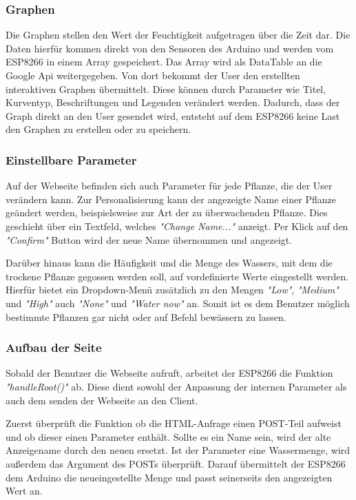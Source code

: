 \subsubsection{Graphen}
Die Graphen stellen den Wert der Feuchtigkeit aufgetragen über die Zeit dar. Die Daten
hierfür kommen direkt von den Sensoren des Arduino und werden vom ESP8266 in einem
Array gespeichert.
Das Array wird als DataTable an die Google Api weitergegeben. Von dort bekommt der User
den erstellten interaktiven Graphen übermittelt. Diese können durch Parameter wie Titel,
Kurventyp, Beschriftungen und Legenden verändert werden.
Dadurch, dass der Graph direkt an den User gesendet wird, entsteht auf dem ESP8266 keine
Last den Graphen zu erstellen oder zu speichern.

\subsubsection{Einstellbare Parameter}
Auf der Webseite befinden sich auch Parameter für jede Pflanze, die der User verändern kann.
Zur Personalisierung kann der angezeigte Name einer Pflanze geändert werden, beispielsweise
zur Art der zu überwachenden Pflanze. Dies geschieht über ein Textfeld, welches \textit{"Change Name..."}
anzeigt. Per Klick auf den \textit{"Confirm"} Button wird der neue Name übernommen und angezeigt.

Darüber hinaus kann die Häufigkeit und die Menge des Wassers, mit dem die trockene Pflanze gegossen werden soll,
auf vordefinierte Werte eingestellt werden.
Hierfür bietet ein Dropdown-Menü zusätzlich zu den Mengen
\textit{"Low"}, \textit{"Medium"} und \textit{"High"} auch \textit{"None"} und \textit{"Water now"} an. Somit ist es dem Benutzer möglich
bestimmte Pflanzen gar nicht oder auf Befehl bewässern zu lassen.

\subsubsection{Aufbau der Seite}
\label{handle}
Sobald der Benutzer die Webseite aufruft, arbeitet der ESP8266 die Funktion \textit{"handleRoot()"} ab.
Diese dient sowohl der Anpassung der internen Parameter als auch dem senden der Webseite an den Client.

Zuerst überprüft die Funktion ob die HTML-Anfrage einen POST-Teil aufweist und ob dieser
einen Parameter enthält. Sollte es ein Name sein, wird der alte Anzeigename durch den neuen
ersetzt. Ist der Parameter eine Wassermenge, wird außerdem das Argument des POSTs überprüft.
Darauf übermittelt der ESP8266 dem Arduino die neueingestellte Menge und passt seinerseits
den angezeigten Wert an.

